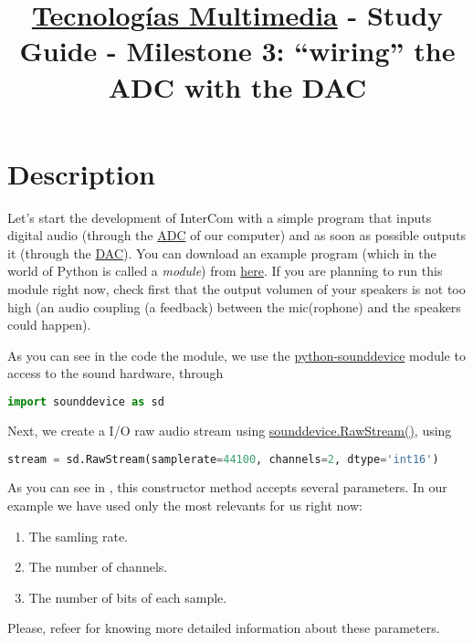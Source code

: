 \title{\href{https://www.ual.es/estudios/grados/presentacion/plandeestudios/asignatura/4015/40154321?idioma=zh_CN}{Tecnologías Multimedia} - Study Guide - Milestone 3: ``wiring'' the ADC with the DAC}

\maketitle

\section{Description}

Let's start the development of InterCom with a simple program that
inputs digital audio (through
the \href{https://en.wikipedia.org/wiki/Analog-to-digital_converter}{ADC}
of our computer) and as soon as possible outputs it (through
the \href{https://en.wikipedia.org/wiki/Digital-to-analog_converter}{DAC}). You
can download an example program (which in the world of Python is
called a \emph{module})
from \href{https://github.com/Tecnologias-multimedia/intercom/blob/master/test/sounddevice/wire3.py}{here}. If
you are planning to run this module right now, check first that the
output volumen of your speakers is not too high (an audio coupling (a
feedback) between the mic(rophone) and the speakers could happen).

As you can see in the code the module, we use the
\href{https://python-sounddevice.readthedocs.io/en/latest/}{python-sounddevice}
\cite{sounddevice} module to access to the sound hardware, through
\begin{lstlisting}[language=Python]
import sounddevice as sd
\end{lstlisting}

Next, we create a I/O raw audio stream
using \href{https://python-sounddevice.readthedocs.io/en/latest/api/raw-streams.html#sounddevice.RawStream}{sounddevice.RawStream()}, using
\begin{lstlisting}[language=Python]
stream = sd.RawStream(samplerate=44100, channels=2, dtype='int16')
\end{lstlisting}

As you can see in \cite{sounddevice}, this constructor method accepts
several parameters. In our example we have used only the most
relevants for us right now:
\begin{enumerate}
\item The samling rate.
\item The number of channels.
\item The number of bits of each sample.
\end{enumerate}
Please, refeer \cite{harmonic-analysis} for knowing more detailed
information about these parameters.

